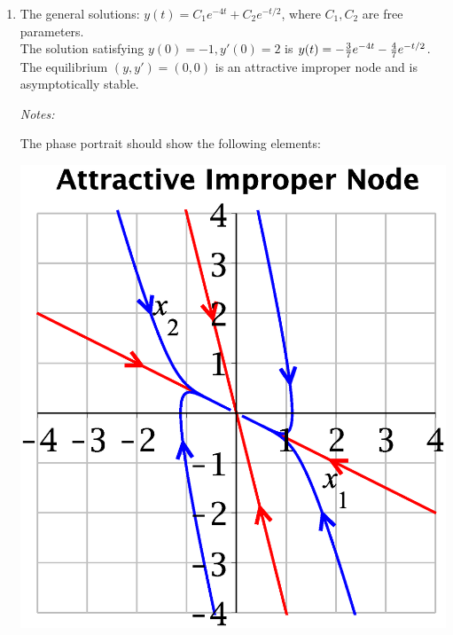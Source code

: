 \item
	\begin{enumerate}
	\item  
The general solutions: 
$\displaystyle y(t)=C_1 e^{-4t} +C_2 e^{-t/2}$,
where $C_1,C_2$ are free parameters.\\[1ex]
The solution satisfying $y(0)=-1,y'(0)=2$ is
$y(t)=-{3\over 7} e^{-4t} -{4\over 7} e^{-t/2}$.\\[1ex]
The equilibrium $(y,y')=(0,0)$ is an attractive improper node
and is asymptotically stable.
\medskip

\begin{minipage}{0.65\textwidth}
{\color{red}\small\em Notes:}
	{\small \color{blue}
The phase portrait
should show the following elements:
}
\end{minipage}
\hfill
\begin{minipage}{0.3\textwidth}
 \includegraphics*[width=\textwidth]{testpr-2nd-ord-eq-attr-node.eps}
\end{minipage}
\medskip
  

\end{enumerate}

